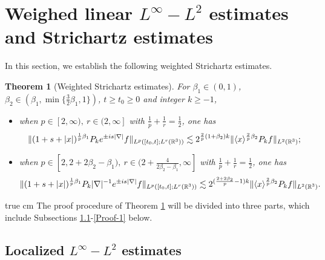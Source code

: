 \documentclass[11pt,twoside]{article}
\def\R{\mathop{\mathbb R\kern 0pt}\nolimits}
\def\f{\frac}
\def\ls{\lesssim}
\newcommand{\w}[1]{\langle {#1} \rangle}
\theoremstyle{plain}
\newtheorem{theorem}{Theorem}[section]
\theoremstyle{definition}
\numberwithin{equation}{section}
\begin{document}
	\section{Weighed linear $L^\infty-L^2$ estimates and Strichartz estimates}\label{sec:3}

	In this section, we establish the following weighted Strichartz estimates.
	\begin{theorem}[Weighted Strichartz estimates]\label{thm:Weighted Strichartz estimate}
		For $\beta_1\in(0,1)$, $\beta_2\in(\beta_1,\min\{\f32\beta_1,1\})$, $t\ge t_0\ge 0$ and integer $k\ge -1$,
		\begin{itemize}
			\item[(1)] when $p\in[2,\infty),\ r\in(2,\infty]$ with $\f1p+\f1r=\f12$, one has
			\begin{equation}\label{thm:Weighted Strichartz estimate 1}
				\|(1+s+|x|)^{\f{1}{p}\beta_1}P_{k}e^{\pm is|\nabla|}f\|_{L^p([t_0,t];L^r(\R^3))}
				\ls2^{\f2p(1+\beta_2)k }\|\w{x}^{\f2p \beta_2}P_kf\|_{L^2(\R^3)};
			\end{equation}
			\item[(2)] when $p\in[2,2+2\beta_2-\beta_1),\ r\in(2+\f{4}{2\beta_2-\beta_1},\infty]$ with $\f1p+\f1r=\f12$, one has
			\begin{equation}\label{thm:Weighted Strichartz estimate 2}
				\|(1+s+|x|)^{\f{1}{p}\beta_1}P_{k}|\nabla|^{-1}e^{\pm is|\nabla|}f\|_{L^p([t_0,t];L^r(\R^3))}
				\ls2^{(\f{2+2\beta_2}{p}-1)k }\|\w{x}^{\f2p \beta_2}P_kf\|_{L^2(\R^3)}.
			\end{equation}
		\end{itemize}
	\end{theorem}
	 true cm
	The proof procedure of Theorem \ref{thm:Weighted Strichartz estimate} will be divided into three parts, which include Subsections
\ref{sec:Linfty-L^2 estimate}-\ref{Proof-1} below.


	\subsection{Localized $L^\infty-L^2$ estimates}\label{sec:Linfty-L^2 estimate}
\end{document}
